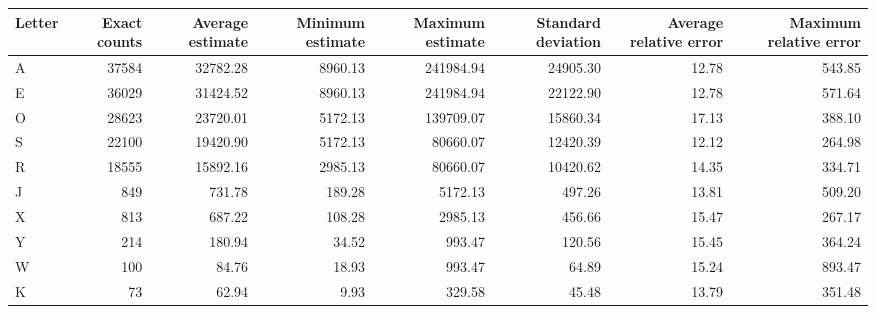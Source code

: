 \begin{tabular}{lrrrrrrr}
\toprule
Letter &  Exact counts &  Average estimate &  Minimum estimate &  Maximum estimate &  Standard deviation &  Average relative error &  Maximum relative error \\
\midrule
     A &         37584 &          32782.28 &           8960.13 &         241984.94 &            24905.30 &                   12.78 &                  543.85 \\
     E &         36029 &          31424.52 &           8960.13 &         241984.94 &            22122.90 &                   12.78 &                  571.64 \\
     O &         28623 &          23720.01 &           5172.13 &         139709.07 &            15860.34 &                   17.13 &                  388.10 \\
     S &         22100 &          19420.90 &           5172.13 &          80660.07 &            12420.39 &                   12.12 &                  264.98 \\
     R &         18555 &          15892.16 &           2985.13 &          80660.07 &            10420.62 &                   14.35 &                  334.71 \\
     J &           849 &            731.78 &            189.28 &           5172.13 &              497.26 &                   13.81 &                  509.20 \\
     X &           813 &            687.22 &            108.28 &           2985.13 &              456.66 &                   15.47 &                  267.17 \\
     Y &           214 &            180.94 &             34.52 &            993.47 &              120.56 &                   15.45 &                  364.24 \\
     W &           100 &             84.76 &             18.93 &            993.47 &               64.89 &                   15.24 &                  893.47 \\
     K &            73 &             62.94 &              9.93 &            329.58 &               45.48 &                   13.79 &                  351.48 \\
\bottomrule
\end{tabular}
